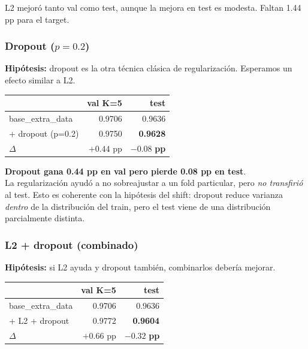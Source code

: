 \documentclass[11pt,a4paper]{article}
\begin{document}
L2 mejoró tanto val como test, aunque la mejora en test es modesta. Faltan 1.44 pp para el target.

\subsubsection{Dropout ($p = 0.2$)}

\textbf{Hipótesis:} dropout es la otra técnica clásica de regularización. Esperamos un efecto similar a L2.

\begin{center}
\small
\begin{tabular}{@{}lrr@{}}
\toprule
& \textbf{val K=5} & \textbf{test} \\
\midrule
base\_extra\_data        & 0.9706 & 0.9636 \\
+ dropout (p=0.2)        & 0.9750 & \cellcolor{warn!10}\textbf{0.9628} \\
$\Delta$                 & $+0.44$ pp & \cellcolor{warn!10}$\boldsymbol{-0.08}$ \textbf{pp} \\
\bottomrule
\end{tabular}
\end{center}

\begin{sorpresa}
\textbf{Dropout gana 0.44 pp en val pero pierde 0.08 pp en test}. \\[0.2em]
La regularización ayudó a no sobreajustar a un fold particular, pero \emph{no transfirió} al test. Esto es coherente con la hipótesis del shift: dropout reduce varianza \emph{dentro} de la distribución del train, pero el test viene de una distribución parcialmente distinta.
\end{sorpresa}

\subsubsection{L2 + dropout (combinado)}

\textbf{Hipótesis:} si L2 ayuda y dropout también, combinarlos debería mejorar.

\begin{center}
\small
\begin{tabular}{@{}lrr@{}}
\toprule
& \textbf{val K=5} & \textbf{test} \\
\midrule
base\_extra\_data        & 0.9706 & 0.9636 \\
+ L2 + dropout           & 0.9772 & \cellcolor{warn!10}\textbf{0.9604} \\
$\Delta$                 & $+0.66$ pp & \cellcolor{warn!10}$\boldsymbol{-0.32}$ \textbf{pp} \\
\bottomrule
\end{tabular}
\end{center}
\end{document}
